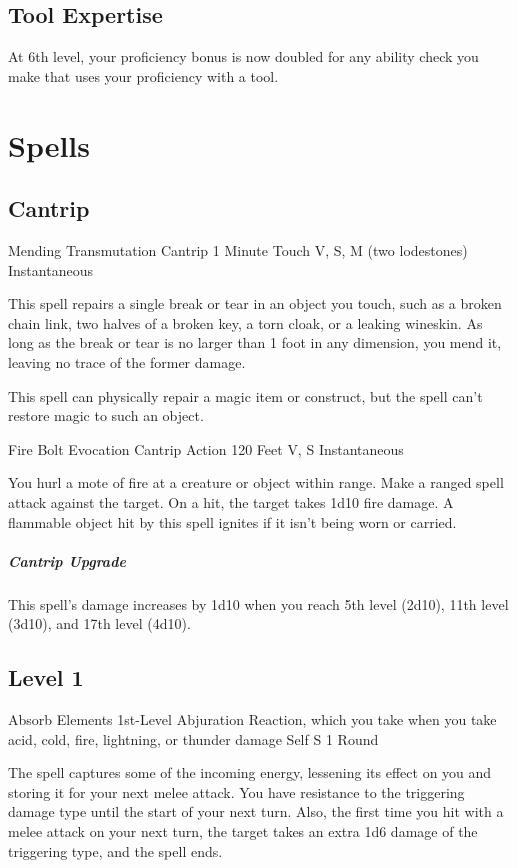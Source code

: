 \documentclass[letterpaper,openany,oneside,twocolumn]{book}
\begin{document}
\subsection*{Tool Expertise}
At 6th level, your proficiency bonus is now doubled for any ability check you make that uses your proficiency with a tool.

\section*{Spells}
\subsection*{Cantrip}

\DndSpellHeader
  {Mending}
  {Transmutation Cantrip}
  {1 Minute}
  {Touch}
  {V, S, M (two lodestones)}
  {Instantaneous}

This spell repairs a single break or tear in an object you touch, such as a broken chain link, two halves of a broken key, a torn cloak, or a leaking wineskin. As long as the break or tear is no larger than 1 foot in any dimension, you mend it, leaving no trace of the former damage.

This spell can physically repair a magic item or construct, but the spell can't restore magic to such an object.

\DndSpellHeader
  {Fire Bolt}
  {Evocation Cantrip}
  {Action}
  {120 Feet}
  {V, S}
  {Instantaneous}

You hurl a mote of fire at a creature or object within range. Make a ranged spell attack against the target. On a hit, the target takes 1d10 fire damage. A flammable object hit by this spell ignites if it isn't being worn or carried.

\subparagraph*{Cantrip Upgrade} This spell's damage increases by 1d10 when you reach 5th level (2d10), 11th level (3d10), and 17th level (4d10).

\subsection*{Level 1}

\DndSpellHeader
  {Absorb Elements}
  {1st-Level Abjuration}
  {Reaction, which you take when you take acid, cold, fire, lightning, or thunder damage}
  {Self}
  {S}
  {1 Round}

The spell captures some of the incoming energy, lessening its effect on you and storing it for your next melee attack. You have resistance to the triggering damage type until the start of your next turn. Also, the first time you hit with a melee attack on your next turn, the target takes an extra 1d6 damage of the triggering type, and the spell ends.
\end{document}
